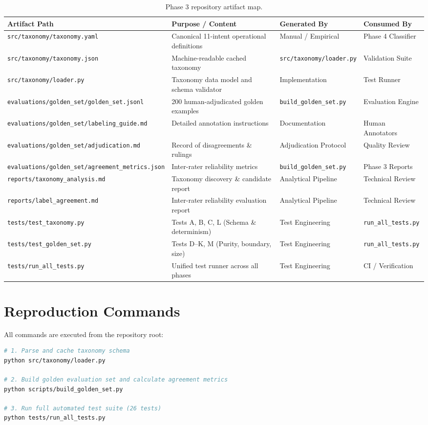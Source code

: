 \documentclass[11pt,a4paper]{article}
\begin{document}
\begin{table}[ht]
\centering
\small
\begin{tabularx}{\textwidth}{lXll}
\toprule
\textbf{Artifact Path} & \textbf{Purpose / Content} & \textbf{Generated By} & \textbf{Consumed By} \\
\midrule
\texttt{src/taxonomy/taxonomy.yaml} & Canonical 11-intent operational definitions & Manual / Empirical & Phase 4 Classifier \\
\texttt{src/taxonomy/taxonomy.json} & Machine-readable cached taxonomy & \texttt{src/taxonomy/loader.py} & Validation Suite \\
\texttt{src/taxonomy/loader.py} & Taxonomy data model and schema validator & Implementation & Test Runner \\
\texttt{evaluations/golden\_set/golden\_set.jsonl} & 200 human-adjudicated golden examples & \texttt{build\_golden\_set.py} & Evaluation Engine \\
\texttt{evaluations/golden\_set/labeling\_guide.md} & Detailed annotation instructions & Documentation & Human Annotators \\
\texttt{evaluations/golden\_set/adjudication.md} & Record of disagreements \& rulings & Adjudication Protocol & Quality Review \\
\texttt{evaluations/golden\_set/agreement\_metrics.json} & Inter-rater reliability metrics & \texttt{build\_golden\_set.py} & Phase 3 Reports \\
\texttt{reports/taxonomy\_analysis.md} & Taxonomy discovery \& candidate report & Analytical Pipeline & Technical Review \\
\texttt{reports/label\_agreement.md} & Inter-rater reliability evaluation report & Analytical Pipeline & Technical Review \\
\texttt{tests/test\_taxonomy.py} & Tests A, B, C, L (Schema \& determinism) & Test Engineering & \texttt{run\_all\_tests.py} \\
\texttt{tests/test\_golden\_set.py} & Tests D--K, M (Purity, boundary, size) & Test Engineering & \texttt{run\_all\_tests.py} \\
\texttt{tests/run\_all\_tests.py} & Unified test runner across all phases & Test Engineering & CI / Verification \\
\bottomrule
\end{tabularx}
\caption{Phase 3 repository artifact map.}
\label{tab:artifact_map}
\end{table}

\section{Reproduction Commands}

All commands are executed from the repository root:
\begin{lstlisting}[language=bash]
# 1. Parse and cache taxonomy schema
python src/taxonomy/loader.py

# 2. Build golden evaluation set and calculate agreement metrics
python scripts/build_golden_set.py

# 3. Run full automated test suite (26 tests)
python tests/run_all_tests.py
\end{lstlisting}
\end{document}
